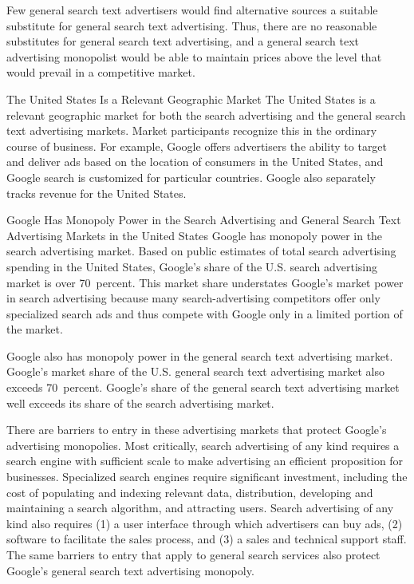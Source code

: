\documentclass[11pt,b5paper,headings=small]{scrartcl}
\begin{document}

Few general search text advertisers would find alternative sources a suitable
substitute for general search text advertising. Thus, there are no reasonable substitutes for
general search text advertising, and a general search text advertising monopolist would be able to
maintain prices above the level that would prevail in a competitive market.




The United States Is a Relevant Geographic Market
The United States is a relevant geographic market for both the search advertising
and the general search text advertising markets. Market participants recognize this in the
ordinary course of business. For example, Google offers advertisers the ability to target and
deliver ads based on the location of consumers in the United States, and Google search is
customized for particular countries. Google also separately tracks revenue for the United States.




Google Has Monopoly Power in the Search Advertising and General
Search Text Advertising Markets in the United States
Google has monopoly power in the search advertising market. Based on public
estimates of total search advertising spending in the United States, Google’s share of the U.S.
search advertising market is over 70~percent. This market share understates Google’s market
power in search advertising because many search-advertising competitors offer only specialized
search ads and thus compete with Google only in a limited portion of the market.


Google also has monopoly power in the general search text advertising market.
Google’s market share of the U.S. general search text advertising market also exceeds
70~percent. Google’s share of the general search text advertising market well exceeds its share of
the search advertising market.


There are barriers to entry in these advertising markets that protect Google’s
advertising monopolies. Most critically, search advertising of any kind requires a search engine
with sufficient scale to make advertising an efficient proposition for businesses. Specialized
search engines require significant investment, including the cost of populating and indexing
relevant data, distribution, developing and maintaining a search algorithm, and attracting users.
Search advertising of any kind also requires (1) a user interface through which advertisers can
buy ads, (2) software to facilitate the sales process, and (3) a sales and technical support staff.
The same barriers to entry that apply to general search services also protect Google’s general
search text advertising monopoly.
\end{document}
